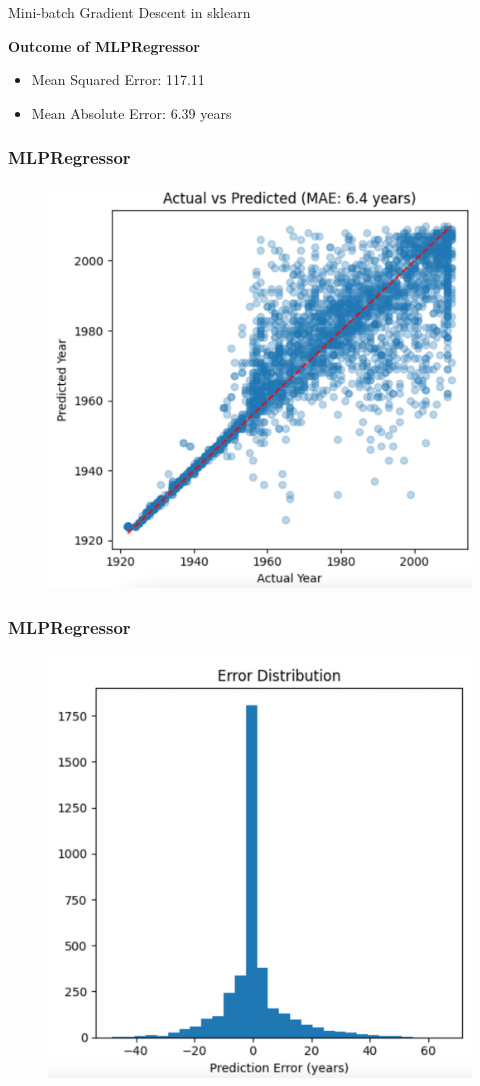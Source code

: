\documentclass{beamer}
\begin{document}
\begin{frame}{Mini-batch Gradient Descent in sklearn}

\textbf{Outcome of MLPRegressor}
\begin{itemize}
    \item Mean Squared Error: 117.11
    \item Mean Absolute Error: 6.39 years
\end{itemize}
\end{frame}

\begin{frame}[fragile]
    \frametitle{{MLPRegressor}}
\begin{figure}
    \centering
    \includegraphics[width=0.75\linewidth]{img/actualVSpredicted.jpg}
\end{figure}
\end{frame}

\begin{frame}[fragile]
    \frametitle{{MLPRegressor}}
\begin{figure}
    \centering
    \includegraphics[width=0.7\linewidth]{img/errorDist.jpg}
\end{figure}
\end{frame}
\end{document}
